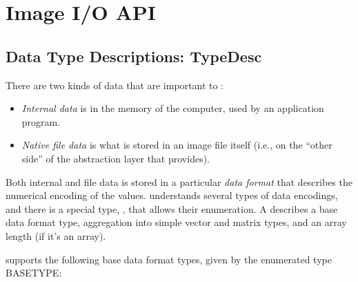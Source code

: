 \chapter{Image I/O API}
\label{chap:imageioapi}



\section{Data Type Descriptions: {\cf TypeDesc}}
\label{sec:dataformats}
\label{sec:TypeDesc}

There are two kinds of data that are important to \product:

\begin{itemize}
\item \emph{Internal data} is in the memory of the computer, used by an
  application program.
\item \emph{Native file data} is what is stored in an image file itself
  (i.e., on the ``other side'' of the abstraction layer that \product
  provides).
\end{itemize}

Both internal and file data is stored in a particular \emph{data format}
that describes the numerical encoding of the values.  \product
understands several types of data encodings, and there is 
a special type, \TypeDesc, that allows their enumeration.
A \TypeDesc describes a base data format type, aggregation into simple
vector and matrix types, and an array length (if
it's an array).

\TypeDesc supports the following base data format types, given by the
enumerated type {\cf BASETYPE}:

\medskip

